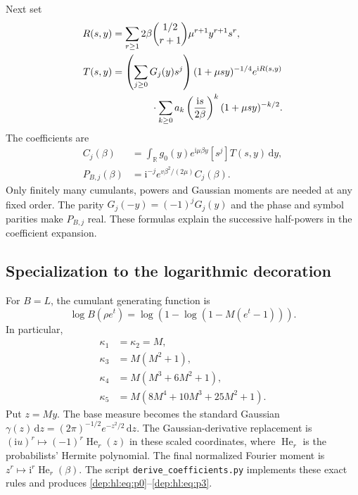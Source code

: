 \documentclass[11pt]{article}
\theoremstyle{definition}\newtheorem{definition}[theorem]{Definition}
\theoremstyle{remark}\newtheorem{remark}[theorem]{Remark}
\newcommand{\ii}{\mathrm i}
\newcommand{\dd}{\,\mathrm d}
\newcommand{\RR}{\mathbb R}
\begin{document}
Next set
\begin{align}
 R(s,y)&=\sum_{r\ge1}2\beta\binom{1/2}{r+1}
                         \mu^{r+1}y^{r+1}s^r,\label{dep:hl:eq:Rrecipe}\\
 T(s,y)&=\left(\sum_{j\ge0}G_j(y)s^j\right)(1+\mu sy)^{-1/4}
                 e^{\ii R(s,y)}\notag\\
 &\hspace{14mm}\cdot\sum_{k\ge0}a_k
       \left(\frac{\ii s}{2\beta}\right)^k(1+\mu sy)^{-k/2}.
 \label{dep:hl:eq:Trecipe}
\end{align}
The coefficients are
\begin{align}
 C_j(\beta)&=\int_\RR g_0(y)e^{\ii\mu\beta y}[s^j]T(s,y)\dd y,
 \label{dep:hl:eq:Crecipe}\\
 P_{B,j}(\beta)&=\ii^{-j}e^{v\beta^2/(2\mu)}C_j(\beta).
 \label{dep:hl:eq:Precipe}
\end{align}
Only finitely many cumulants, powers and Gaussian moments are needed
at any fixed order. The parity $G_j(-y)=(-1)^jG_j(y)$ and the phase
and symbol parities make $P_{B,j}$ real. These formulas explain the
successive half-powers in the coefficient expansion.

\subsection{Specialization to the logarithmic decoration}
For $B=L$, the cumulant generating function is
\begin{equation}\label{dep:hl:eq:cumgen}
 \log B(\rho e^t)=\log\left(1-\log(1-M(e^t-1))\right).
\end{equation}
In particular,
\begin{align*}
 \kappa_1&=\kappa_2=M,\\
 \kappa_3&=M(M^2+1),\\
 \kappa_4&=M(M^3+6M^2+1),\\
 \kappa_5&=M(8M^4+10M^3+25M^2+1).
\end{align*}
Put $z=My$. The base measure becomes the standard Gaussian
$\gamma(z)\dd z=(2\pi)^{-1/2}e^{-z^2/2}\dd z$.
The Gaussian-derivative replacement is
$(\ii u)^r\mapsto(-1)^r\operatorname{He}_r(z)$ in these scaled
coordinates, where $\operatorname{He}_r$ is the probabilists' Hermite
polynomial. The final normalized Fourier moment is
$z^r\mapsto\ii^r\operatorname{He}_r(\beta)$.
The script \texttt{derive\_coefficients.py} implements these exact
rules and produces \eqref{dep:hl:eq:p0}--\eqref{dep:hl:eq:p3}.
\end{document}
